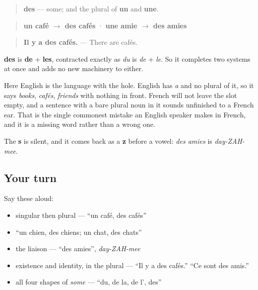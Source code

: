 \begin{cousinweb}
\begin{quote}
\textbf{des} — some; and the plural of \textbf{un} and \textbf{une}.
\end{quote}

\begin{quote}
\textbf{un café $\to$ des cafés} · \textbf{une amie $\to$ des amies}
\end{quote}

\begin{quote}
\textbf{Il y a des cafés.} — There are cafés.
\end{quote}

\textbf{des} is \textbf{de} + \textbf{les}, contracted exactly as \emph{du} is \emph{de} + \emph{le}. So it completes two systems at once and adds no new machinery to either.

Here English is the language with the hole. English has \emph{a} and no plural of it, so it says \emph{books}, \emph{cafés}, \emph{friends} with nothing in front. French will not leave the slot empty, and a sentence with a bare plural noun in it sounds unfinished to a French ear. That is the single commonest mistake an English speaker makes in French, and it is a missing word rather than a wrong one.

The \textbf{s} is silent, and it comes back as a \textbf{z} before a vowel: \emph{des amies} is \emph{day-ZAH-mee}.
\end{cousinweb}

\subsection*{Your turn}
Say these aloud:

\begin{itemize}
\raggedright
  \item singular then plural — \textquotedblleft{}un café, des cafés\textquotedblright{}
  \item \textquotedblleft{}un chien, des chiens; un chat, des chats\textquotedblright{}
  \item the liaison — \textquotedblleft{}des amies\textquotedblright{}, \emph{day-ZAH-mee}
  \item existence and identity, in the plural — \textquotedblleft{}Il y a des cafés.\textquotedblright{} \textquotedblleft{}Ce sont des amis.\textquotedblright{}
  \item all four shapes of \emph{some} — \textquotedblleft{}du, de la, de l', des\textquotedblright{}
\end{itemize}

